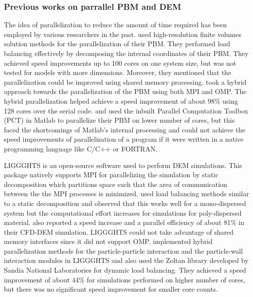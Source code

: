 \documentclass[preprint,11pt,authoryear]{elsarticle}
\begin{document}
\subsubsection{Previous works on parrallel PBM and DEM}
The idea of parallelization to reduce the amount of time required has been employed by various 
researchers in the past. \cite{Gunawan2008} used high-resolution finite volumes solution methods for 
the parallelization of their PBM. They performed load balancing effectively by 
decomposing the internal coordinates of their PBM. They achieved speed improvements up to 100 
cores on one system size, but was not tested for models with more dimensions. Moreover, they 
mentioned that the parallelization could be improved using shared memory processing. 
\cite{Bettencourt2017} took a hybrid approach towards the parallelization of the PBM using both 
MPI and OMP. The hybrid parallelization helped achieve 
a speed improvement of about 98\% using 128 cores over the serial code. \cite{Prakash2013a} and \cite{Prakash2013b} 
used the inbuilt Parallel Computation Toolbox (PCT) in Matlab \citep{pctMatlab} to parallelize their PBM on lower number 
of cores, but this faced the shortcomings of Matlab's internal processing and could not achieve the 
speed improvements of parallelization of a program if it were written in a native programming language 
like C/C++ or FORTRAN. 

LIGGGHTS is an open-source software used to perform DEM simulations. This package natively 
supports MPI for parallelizing the simulation by static decomposition which partitions space such that 
the area of communication between the the MPI processes is minimized. \cite{kacianauskas2010} used 
load balancing methods similar to a static decomposition and observed that this works well for a 
mono-dispersed system but the computational effort increases for simulations for poly-dispersed 
material. \cite{Gopalakrishnan2013} also reported a speed increase and a parallel efficiency of about 
81\% in their CFD-DEM simulation. LIGGGHTS could not take advantage of shared memory interfaces 
since it did not support OMP. \cite{Berger2015} implemented hybrid parallelization methods for the 
particle-particle interaction and the particle-wall interaction modules in LIGGGHTS and also used the 
Zoltan library \citep{Boman2012} developed by Sandia National Laboratories for dynamic load 
balancing. They achieved a speed improvement of about 44\% for simulations performed on higher 
number of cores, but there was no significant speed improvement for smaller core counts. 
\end{document}
